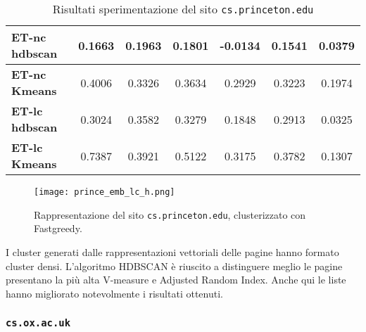 \begin{table}[H]
\begin{tabular}{| l | c | c | c | c | c | c |}
	\textbf{ET-nc hdbscan} & 0.1663 & 0.1963 & 0.1801 & -0.0134 & 0.1541 & 0.0379\\ [2ex]
	 \hline
	\textbf{ET-nc Kmeans} & 0.4006 & 0.3326 & 0.3634 & 0.2929 & 0.3223 & 0.1974\\ [2ex]
	 \hline	
	\textbf{ET-lc hdbscan} & 0.3024 & 0.3582 & 0.3279 & 0.1848 & 0.2913 & 0.0325\\ [2ex]
	\hline
	\textbf{ET-lc Kmeans} & 0.7387 & 0.3921 & 0.5122 & 0.3175 & 0.3782 & 0.1307\\ [2ex]
	\hline
	
	\end{tabular}
	\caption{Risultati sperimentazione del sito \texttt{cs.princeton.edu}}
	\label{metrichePrinc}
\end{table}

\begin{figure}[ht!]
	\centering
	\texttt{[image: prince\_emb\_lc\_h.png]}
	\caption{Rappresentazione del sito \texttt{cs.princeton.edu}, clusterizzato con Fastgreedy.}
	\label{lc_emb_h}
\end{figure}

I cluster generati dalle rappresentazioni vettoriali delle pagine hanno formato cluster densi. L'algoritmo HDBSCAN è riuscito a distinguere meglio le pagine presentano la più alta V-measure e Adjusted Random Index. Anche qui le liste hanno migliorato notevolmente i risultati ottenuti. 


\subsubsection{\texttt{cs.ox.ac.uk}}

